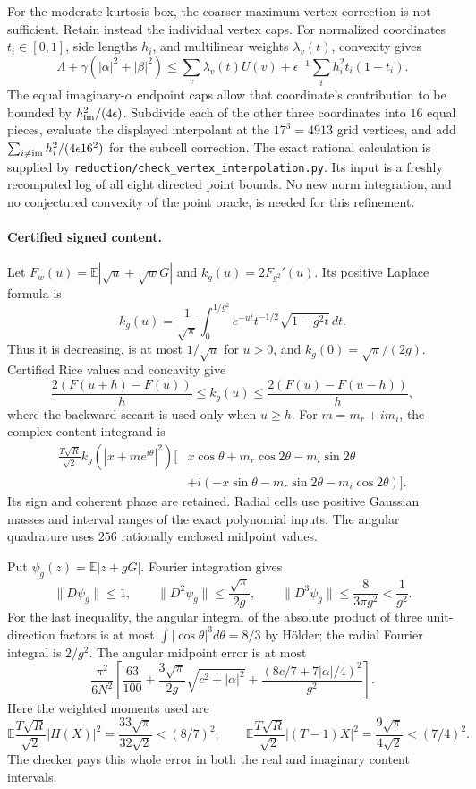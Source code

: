 For the moderate-kurtosis box, the coarser maximum-vertex correction is
not sufficient. Retain instead the individual vertex caps. For normalized
coordinates $t_i\in[0,1]$, side lengths $h_i$, and multilinear weights
$\lambda_v(t)$, convexity gives
\[
 \Lambda+\gamma(|\alpha|^2+|\beta|^2)
 \le \sum_v\lambda_v(t)U(v)
    +\epsilon^{-1}\sum_i h_i^2t_i(1-t_i).
\]
The equal imaginary-$\alpha$ endpoint caps allow that coordinate's
contribution to be bounded by $h_{\rm im}^2/(4\epsilon)$. Subdivide each
of the other three coordinates into $16$ equal pieces, evaluate the
displayed interpolant at the $17^3=4913$ grid vertices, and add
$\sum_{i\ne\rm im}h_i^2/(4\epsilon16^2)$ for the subcell correction.
The exact rational calculation is supplied by
\texttt{reduction/check\_vertex\_interpolation.py}. Its input is a
freshly recomputed log of all eight directed point bounds. No new
norm integration, and no conjectured convexity of the point oracle,
is needed for this refinement.

\paragraph{Certified signed content.}
Let $F_w(u)=\mathbb E|\sqrt u+\sqrt wG|$ and
$k_g(u)=2F_{g^2}'(u)$. Its positive Laplace formula is
\[
 k_g(u)=\frac1{\sqrt\pi}\int_0^{1/g^2}
 e^{-ut}t^{-1/2}\sqrt{1-g^2t}\,dt.
\]
Thus it is decreasing, is at most $1/\sqrt u$ for $u>0$, and
$k_g(0)=\sqrt\pi/(2g)$. Certified Rice values and concavity give
\[
 \frac{2(F(u+h)-F(u))}{h}\le k_g(u)
 \le\frac{2(F(u)-F(u-h))}{h},
\]
where the backward secant is used only when $u\ge h$.
For $m=m_r+im_i$, the complex content integrand is
\begin{align*}
 \frac{T\sqrt R}{\sqrt2}k_g(|x+me^{i\theta}|^2)
 \bigl[&x\cos\theta+m_r\cos2\theta-m_i\sin2\theta\\
 &+i(-x\sin\theta-m_r\sin2\theta-m_i\cos2\theta)\bigr].
\end{align*}
Its sign and coherent phase are retained. Radial cells use positive
Gaussian masses and interval ranges of the exact polynomial inputs.
The angular quadrature uses $256$ rationally enclosed midpoint values.

Put $\psi_g(z)=\mathbb E|z+gG|$. Fourier integration gives
\[
 \|D\psi_g\|\le1,\qquad
 \|D^2\psi_g\|\le\frac{\sqrt\pi}{2g},\qquad
 \|D^3\psi_g\|\le\frac8{3\pi g^2}<\frac1{g^2}.
\]
For the last inequality, the angular integral of the absolute product of
three unit-direction factors is at most $\int|\cos\theta|^3d\theta=8/3$
by H\"older; the radial Fourier integral is $2/g^2$.
The angular midpoint error is at most
\[
 \frac{\pi^2}{6N^2}\left[
 \frac{63}{100}+\frac{3\sqrt\pi}{2g}\sqrt{c^2+|\alpha|^2}
 +\frac{(8c/7+7|\alpha|/4)^2}{g^2}\right].
\]
Here the weighted moments used are
\[
 \mathbb E\frac{T\sqrt R}{\sqrt2}|H(X)|^2
 =\frac{33\sqrt\pi}{32\sqrt2}<(8/7)^2,\qquad
 \mathbb E\frac{T\sqrt R}{\sqrt2}|(T-1)X|^2
 =\frac{9\sqrt\pi}{4\sqrt2}<(7/4)^2.
\]
The checker pays this whole error in both the real and imaginary
content intervals.

